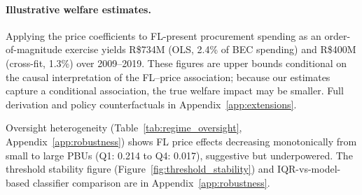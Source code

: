 \paragraph{Illustrative welfare estimates.}
Applying the price coefficients to FL-present procurement spending
as an order-of-magnitude exercise yields R\$734M (OLS, 2.4\% of BEC
spending) and R\$400M (cross-fit, 1.3\%) over 2009--2019. These
figures are upper bounds conditional on the causal interpretation of
the FL--price association; because our estimates capture a conditional
association, the true welfare impact may be smaller. Full derivation
and policy counterfactuals in Appendix~\ref{app:extensions}.


Oversight heterogeneity (Table~\ref{tab:regime_oversight}, Appendix~\ref{app:robustness}) shows FL price effects decreasing monotonically from small to large PBUs (Q1: 0.214 to Q4: 0.017), suggestive but underpowered. The threshold stability figure (Figure~\ref{fig:threshold_stability}) and IQR-vs-model-based classifier comparison are in Appendix~\ref{app:robustness}.
